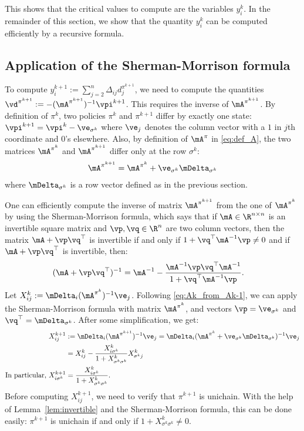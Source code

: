 This shows that the critical values to compute are the variables $y^k_i$. In the remainder of this section, we show that the quantity $y^k_i$ can be computed efficiently by a recursive formula.

\subsection{Application of the Sherman-Morrison formula}
\label{ssec:sm_form}

To compute $y^{k+1}_i := \sum_{j=2}^n\Delta_{ij}d_j^{\pi^{k+1}}$, we need to compute the quantities $\vd^{\pi^{k+1}} := -(\mA^{\pi^{k+1}})^{-1}\vpi^{k+1}$.
This requires the inverse of ${\mA^{\pi^{k+1}}}$.
By definition of $\pi^k$, two policies $\pi^k$ and $\pi^{k+1}$ differ by exactly one state: $\vpi^{k+1}=\vpi^k - \ve_{\sigma^k}$ where $\ve_j$ denotes the column vector with a $1$ in $j$th coordinate and $0$'s elsewhere.
Also, by definition of $\mA^\pi$ in \eqref{eq:def_A}, the two matrices $\mA^{\pi^k}$ and $\mA^{\pi^{k+1}}$ differ only at the row $\sigma^k$:
\begin{align}
    \mA^{\pi^{k+1}} = \mA^{\pi^k} + \ve_{\sigma^k} \mDelta_{\sigma^k}
    \label{eq:Ak_from_Ak-1}
\end{align}
where $\mDelta_{\sigma^k}$ is a row vector defined as in the previous section.

One can efficiently compute the inverse of matrix $\mA^{\pi^{k+1}}$ from the one of $\mA^{\pi^k}$ by using the Sherman-Morrison formula, which says that if $\mA\in\R^{n\times n}$ is an invertible square matrix and $\vp, \vq\in\R^n$ are two column vectors, then the matrix $\mA+\vp\vq^\top$ is invertible if and only if $1+\vq^\top \mA^{-1}\vp\neq0$ and if $\mA+\vp\vq^\top$ is invertible, then:
\begin{align*}
    (\mA + \vp\vq^\top)^{-1}
    &=\mA^{-1} - \frac{\mA^{-1}\vp\vq^\top \mA^{-1}}{1+\vq^\top \mA^{-1}\vp}.
\end{align*}
Let $X^k_{ij} := \mDelta_i (\mA^{\pi^k})^{-1}\ve_j$. Following \eqref{eq:Ak_from_Ak-1}, we can apply the Sherman-Morrison formula with matrix $\mA^{\pi^k}$, and vectors $\vp=\ve_{\sigma^k}$ and $\vq^\top=\mDelta_{\sigma^k}$. After some simplification, we get:
\begin{align}
    X^{k+1}_{ij} &:= \mDelta_i (\mA^{\pi^{k+1}})^{-1}\ve_j =\mDelta_i (\mA^{\pi^k}+\ve_{\sigma^k}\mDelta_{\sigma^k})^{-1}\ve_j\nonumber\\
                 &= X^{k}_{ij} - \frac{X^{k}_{i\sigma^k} }{1+X^{k}_{\sigma^k \sigma^k}}X^{k}_{\sigma^k j} \label{eq:X^k+1-i} \\
    \text{In particular,}\ X^{k+1}_{i\sigma^k} &=\frac{X^{k}_{i\sigma^k}}{1+X^{k}_{\sigma^k \sigma^k}}.\nonumber
\end{align}
Before computing $X^{k+1}_{ij}$, we need to verify that $\pi^{k+1}$ is unichain.
With the help of Lemma~\ref{lem:invertible} and the Sherman-Morrison formula, this can be done easily: $\pi^{k+1}$ is unichain if and only if $1+X^k_{\sigma^k\sigma^k}\neq0$. 


